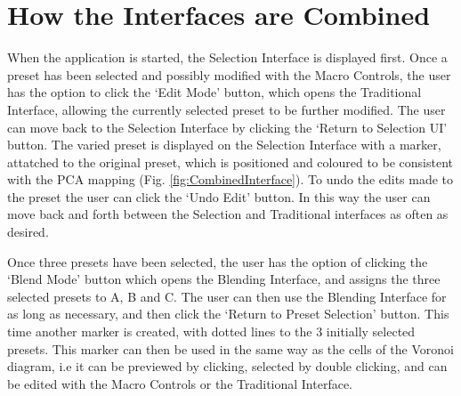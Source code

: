 \documentclass[11pt, oneside]{report}   	%
\begin{document}
\section{How the Interfaces are Combined}
When the application is started, the Selection Interface is displayed first. Once a preset has been selected and possibly modified with the Macro Controls, the user has the option to click the `Edit Mode' button, which opens the Traditional Interface, allowing the currently selected preset to be further modified. The user can move back to the Selection Interface by clicking the `Return to Selection UI' button. The varied preset is displayed on the Selection Interface with a marker, attatched to the original preset, which is positioned and coloured to be consistent with the PCA mapping (Fig. \ref{fig:CombinedInterface}). To undo the edits made to the preset the user can click the `Undo Edit' button. In this way the user can move back and forth between the Selection and Traditional interfaces as often as desired.

Once three presets have been selected, the user has the option of clicking the `Blend Mode' button which opens the Blending Interface, and assigns the three selected presets to A, B and C. The user can then use the Blending Interface for as long as necessary, and then click the `Return to Preset Selection' button. This time another marker is created, with dotted lines to the 3 initially selected presets. 
This marker can then be used in the same way as the cells of the Voronoi diagram, i.e it can be previewed by clicking, selected by double clicking, and can be edited with the Macro Controls or the Traditional Interface.
\end{document}
